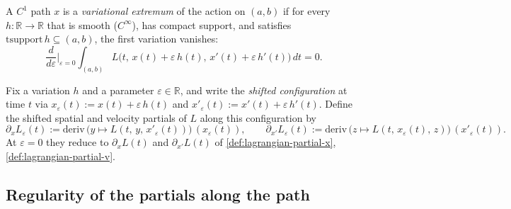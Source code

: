 \begin{definition}
    \label{def:variational-extremum}
    \leanok
    A $C^1$ path $x$ is a \emph{variational extremum} of the action on $(a,b)$
    if for every $h : \mathbb{R} \to \mathbb{R}$ that is smooth
    ($C^\infty$), has compact support, and satisfies $\mathrm{tsupport}\, h
    \subseteq (a,b)$, the first variation vanishes:
    \[
      \frac{d}{d\varepsilon}\Bigg|_{\varepsilon = 0}
        \int_{(a,b)} L\bigl(t,\, x(t) + \varepsilon\, h(t),\,
          x'(t) + \varepsilon\, h'(t)\bigr)\, dt = 0 .
    \]
\end{definition}

\begin{definition}
    \label{def:shifted-partials}
    \leanok
    Fix a variation $h$ and a parameter $\varepsilon \in \mathbb{R}$, and write the
    \emph{shifted configuration} at time $t$ via
    $x_\varepsilon(t) := x(t) + \varepsilon\, h(t)$ and
    $x'_\varepsilon(t) := x'(t) + \varepsilon\, h'(t)$. Define the shifted spatial
    and velocity partials of $L$ along this configuration by
    \[
      \partial_x L_\varepsilon(t) := \mathrm{deriv}\,\bigl(y \mapsto
        L(t,\, y,\, x'_\varepsilon(t))\bigr)\,(x_\varepsilon(t)), \qquad
      \partial_{x'} L_\varepsilon(t) := \mathrm{deriv}\,\bigl(z \mapsto
        L(t,\, x_\varepsilon(t),\, z)\bigr)\,(x'_\varepsilon(t)).
    \]
    At $\varepsilon = 0$ they reduce to $\partial_x L(t)$ and
    $\partial_{x'} L(t)$ of \cref{def:lagrangian-partial-x},
    \cref{def:lagrangian-partial-v}.
\end{definition}

\subsection{Regularity of the partials along the path}


